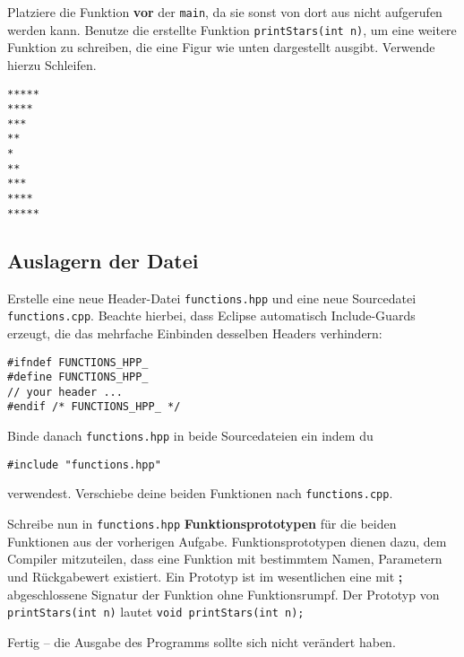 Platziere die Funktion \textbf{vor} der \texttt{main}, da sie sonst von dort aus nicht aufgerufen werden kann.
Benutze die erstellte Funktion \texttt{printStars(int n)}, um eine weitere Funktion zu schreiben, die eine Figur wie unten dargestellt ausgibt.
Verwende hierzu Schleifen.
\begin{lstlisting}
*****
****
***
**
*
**
***
****
*****
\end{lstlisting}


\subsection{Auslagern der Datei}
Erstelle eine neue Header-Datei \texttt{functions.hpp} und eine neue Sourcedatei \texttt{functions.cpp}. Beachte hierbei, dass Eclipse automatisch Include-Guards erzeugt, die das mehrfache Einbinden desselben Headers verhindern:
\begin{lstlisting}
#ifndef FUNCTIONS_HPP_
#define FUNCTIONS_HPP_
// your header ...
#endif /* FUNCTIONS_HPP_ */
\end{lstlisting}
Binde danach \texttt{functions.hpp} in beide Sourcedateien ein indem du
\begin{lstlisting}
#include "functions.hpp"
\end{lstlisting}
verwendest.
Verschiebe deine beiden Funktionen nach \texttt{functions.cpp}.

Schreibe nun in \texttt{functions.hpp} \textbf{Funktionsprototypen} für die beiden Funktionen aus der vorherigen Aufgabe.
Funktionsprototypen dienen dazu, dem Compiler mitzuteilen, dass eine Funktion mit bestimmtem Namen, Parametern und Rückgabewert existiert.
Ein Prototyp ist im wesentlichen eine mit \textbf{;} abgeschlossene Signatur der Funktion ohne Funktionsrumpf.
Der Prototyp von \texttt{printStars(int n)} lautet \texttt{void printStars(int n);}

Fertig -- die Ausgabe des Programms sollte sich nicht verändert haben.


